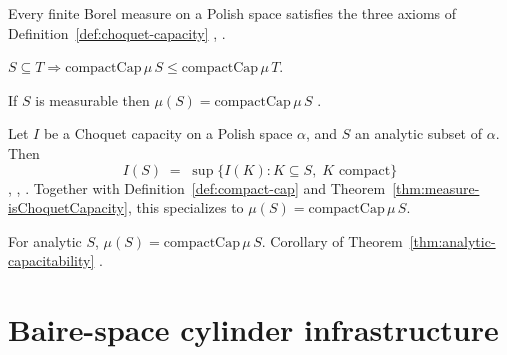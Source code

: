 \begin{thm}
\label{thm:measure-isChoquetCapacity}
  \leanok
Every finite Borel measure on a Polish space satisfies the three
axioms of Definition~\ref{def:choquet-capacity}
\cite[III.7]{dellacherie-meyer}, \cite[Thm 17.11]{kechris1995classical}.
\end{thm}

\begin{thm}
\label{thm:compactCap-mono}
  \leanok
$S \subseteq T \Rightarrow \mathrm{compactCap}\,\mu\,S \le \mathrm{compactCap}\,\mu\,T$.
\end{thm}

\begin{thm}
\label{thm:measurable-compactCap-eq}
  \leanok
If $S$ is measurable then $\mu(S) = \mathrm{compactCap}\,\mu\,S$
\cite[Thm 17.11]{kechris1995classical}.
\end{thm}

\begin{thm}
\label{thm:analytic-capacitability}
  \leanok
Let $I$ be a Choquet capacity on a Polish space $\alpha$, and $S$ an
analytic subset of $\alpha$. Then
\[
  I(S) \;=\; \sup \{ I(K) : K \subseteq S,\; K \text{ compact} \}
\]
\cite[Thm 30.13]{kechris1995classical}, \cite{choquet1955},
\cite[III.29--III.33]{dellacherie-meyer}.
Together with Definition~\ref{def:compact-cap} and
Theorem~\ref{thm:measure-isChoquetCapacity}, this specializes to
$\mu(S) = \mathrm{compactCap}\,\mu\,S$.
\end{thm}

\begin{thm}
\label{thm:analytic-compactCap-eq}
  \leanok
For analytic $S$, $\mu(S) = \mathrm{compactCap}\,\mu\,S$. Corollary
of Theorem~\ref{thm:analytic-capacitability}
\cite[Thm 30.13]{kechris1995classical}.
\end{thm}

\section{Baire-space cylinder infrastructure}\label{sec:cylinders}

